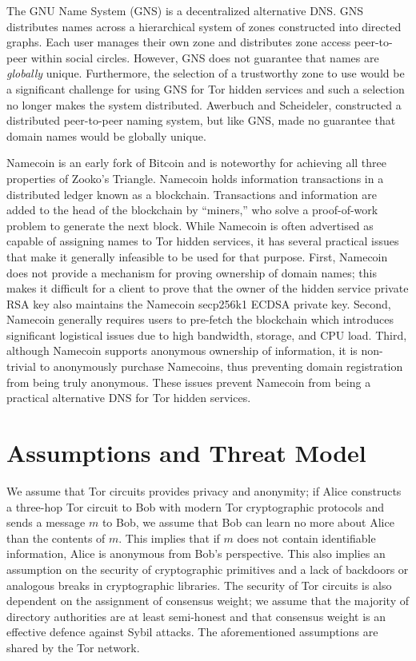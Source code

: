 \documentclass[USenglish,oneside,twocolumn]{article}
\begin{document}
The GNU Name System \cite{wachs2014censorship} (GNS) is a decentralized alternative DNS. GNS distributes names across a hierarchical system of zones constructed into directed graphs. Each user manages their own zone and distributes zone access peer-to-peer within social circles. However, GNS does not guarantee that names are \emph{globally} unique. Furthermore, the selection of a trustworthy zone to use would be a significant challenge for using GNS for Tor hidden services and such a selection no longer makes the system distributed. Awerbuch and Scheideler, \cite{awerbuch2004group} constructed a distributed peer-to-peer naming system, but like GNS, made no guarantee that domain names would be globally unique.

Namecoin \cite{NamecoinHome} is an early fork of Bitcoin \cite{nakamoto2008bitcoin} and is noteworthy for achieving all three properties of Zooko's Triangle. Namecoin holds information transactions in a distributed ledger known as a blockchain. Transactions and information are added to the head of the blockchain by ``miners,'' who solve a proof-of-work problem to generate the next block. While Namecoin is often advertised as capable of assigning names to Tor hidden services, it has several practical issues that make it generally infeasible to be used for that purpose. First, Namecoin does not provide a mechanism for proving ownership of domain names; this makes it difficult for a client to prove that the owner of the hidden service private RSA key also maintains the Namecoin secp256k1 ECDSA private key. Second, Namecoin generally requires users to pre-fetch the blockchain which introduces significant logistical issues due to high bandwidth, storage, and CPU load. Third, although Namecoin supports anonymous ownership of information, it is non-trivial to anonymously purchase Namecoins, thus preventing domain registration from being truly anonymous. These issues prevent Namecoin from being a practical alternative DNS for Tor hidden services.


\section{Assumptions and Threat Model}
\label{sec:threatModel}

We assume that Tor circuits provides privacy and anonymity; if Alice constructs a three-hop Tor circuit to Bob with modern Tor cryptographic protocols and sends a message $ m $ to Bob, we assume that Bob can learn no more about Alice than the contents of $ m $. This implies that if $ m $ does not contain identifiable information, Alice is anonymous from Bob's perspective. This also implies an assumption on the security of cryptographic primitives and a lack of backdoors or analogous breaks in cryptographic libraries. The security of Tor circuits is also dependent on the assignment of consensus weight; we assume that the majority of directory authorities are at least semi-honest and that consensus weight is an effective defence against Sybil attacks. The aforementioned assumptions are shared by the Tor network.
\end{document}
